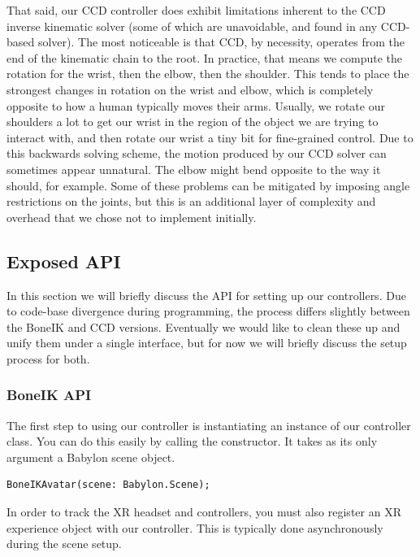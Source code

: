 \documentclass{vgtc}                          %
\begin{document}
    That said, our CCD controller does exhibit limitations inherent to the CCD inverse kinematic solver (some of which are unavoidable, and found in any CCD-based solver). The most noticeable is that CCD, by necessity, operates from the end of the kinematic chain to the root. In practice, that means we compute the rotation for the wrist, then the elbow, then the shoulder. This tends to place the strongest changes in rotation on the wrist and elbow, which is completely opposite to how a human typically moves their arms. Usually, we rotate our shoulders a lot to get our wrist in the region of the object we are trying to interact with, and then rotate our wrist a tiny bit for fine-grained control. Due to this backwards solving scheme, the motion produced by our CCD solver can sometimes appear unnatural. The elbow might bend opposite to the way it should, for example. Some of these problems can be mitigated by imposing angle restrictions on the joints, but this is an additional layer of complexity and overhead that we chose not to implement initially.

\subsection{Exposed API}

    In this section we will briefly discuss the API for setting up our controllers. Due to code-base divergence during programming, the process differs slightly between the BoneIK and CCD versions. Eventually we would like to clean these up and unify them under a single interface, but for now we will briefly discuss the setup process for both.

\subsubsection{BoneIK API}

The first step to using our controller is instantiating an instance of our controller class. You can do this easily by calling the constructor. It takes as its only argument a Babylon scene object.
    
\begin{verbatim}
BoneIKAvatar(scene: Babylon.Scene);
\end{verbatim}

In order to track the XR headset and controllers, you must also register an XR experience object with our controller. This is typically done asynchronously during the scene setup.
\end{document}
